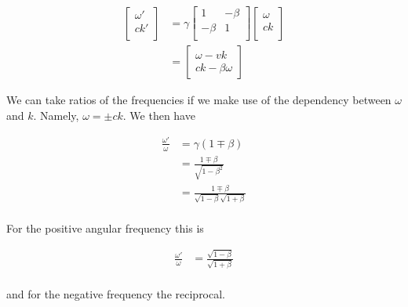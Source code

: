 \documentclass{article}
\begin{document}
\begin{align*}
\begin{bmatrix}
\omega' \\
c k' \\
\end{bmatrix}
&=
\gamma
\begin{bmatrix}
1 & -\beta \\
-\beta& 1 \\
\end{bmatrix}
\begin{bmatrix}
\omega \\
c k \\
\end{bmatrix} 
\\
&=
\begin{bmatrix}
\omega - v k \\
c k - \beta \omega
\end{bmatrix} 
\end{align*}

We can take ratios of the frequencies if we make use of the dependency between $\omega$ and $k$.  Namely, $\omega = \pm c k$.  We then have

\begin{align*}
\frac{\omega'}{\omega}
&= \gamma(1 \mp \beta) \\
&= \frac{1 \mp \beta}{\sqrt{1 - \beta^2}} \\
&= \frac{1 \mp \beta}{\sqrt{1 - \beta}\sqrt{1 + \beta}} \\
\end{align*}

For the positive angular frequency this is

\begin{align*}
\frac{\omega'}{\omega}
&= \frac{\sqrt{1 - \beta}}{\sqrt{1 + \beta}} 
\\
\end{align*}

and for the negative frequency the reciprocal.



\end{document}
